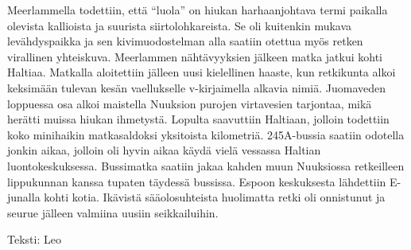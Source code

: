 \begin{multicols}{2}
Meerlammella todettiin, että “luola” on hiukan harhaanjohtava termi paikalla olevista kallioista ja suurista siirtolohkareista. Se oli kuitenkin mukava levähdyspaikka ja sen kivimuodostelman alla saatiin otettua myös retken virallinen yhteiskuva. Meerlammen nähtävyyksien jälkeen matka jatkui kohti Haltiaa. Matkalla aloitettiin jälleen uusi kielellinen haaste, kun retkikunta alkoi keksimään tulevan kesän vaellukselle v-kirjaimella alkavia nimiä. Juomaveden loppuessa osa alkoi maistella Nuuksion purojen virtavesien tarjontaa, mikä herätti muissa hiukan ihmetystä. Lopulta saavuttiin Haltiaan, jolloin todettiin koko minihaikin matkasaldoksi yksitoista kilometriä. 245A-bussia saatiin odotella jonkin aikaa, jolloin oli hyvin aikaa käydä vielä vessassa Haltian luontokeskuksessa. Bussimatka saatiin jakaa kahden muun Nuuksiossa retkeilleen lippukunnan kanssa tupaten täydessä bussissa. Espoon keskuksesta lähdettiin E-junalla kohti kotia. Ikävistä sääolosuhteista huolimatta retki oli onnistunut ja seurue jälleen valmiina uusiin seikkailuihin.

\end{multicols}

\vfill

\noindent\null\hfill Teksti: Leo
